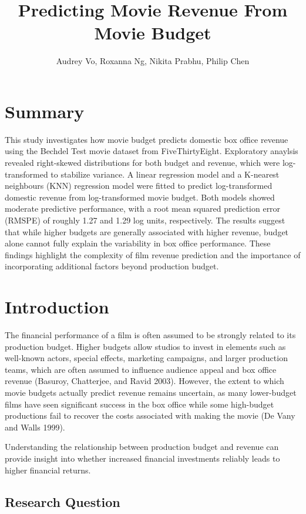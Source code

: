 \documentclass[
  letterpaper,
  DIV=11,
  numbers=noendperiod]{scrartcl}
\title{Predicting Movie Revenue From Movie Budget}
\author{Audrey Vo, Roxanna Ng, Nikita Prabhu, Philip Chen}
\date{}
\begin{document}
\maketitle


\section{Summary}\label{summary}

This study investigates how movie budget predicts domestic box office
revenue using the Bechdel Test movie dataset from FiveThirtyEight.
Exploratory anaylsis revealed right-skewed distributions for both budget
and revenue, which were log-transformed to stabilize variance. A linear
regression model and a K-nearest neighbours (KNN) regression model were
fitted to predict log-transformed domestic revenue from log-transformed
movie budget. Both models showed moderate predictive performance, with a
root mean squared prediction error (RMSPE) of roughly 1.27 and 1.29 log
units, respectively. The results suggest that while higher budgets are
generally associated with higher revenue, budget alone cannot fully
explain the variability in box office performance. These findings
highlight the complexity of film revenue prediction and the importance
of incorporating additional factors beyond production budget.

\section{Introduction}\label{introduction}

The financial performance of a film is often assumed to be strongly
related to its production budget. Higher budgets allow studios to invest
in elements such as well-known actors, special effects, marketing
campaigns, and larger production teams, which are often assumed to
influence audience appeal and box office revenue (Basuroy, Chatterjee,
and Ravid 2003). However, the extent to which movie budgets actually
predict revenue remains uncertain, as many lower-budget films have seen
significant success in the box office while some high-budget productions
fail to recover the costs associated with making the movie (De Vany and
Walls 1999).

Understanding the relationship between production budget and revenue can
provide insight into whether increased financial investments reliably
leads to higher financial returns.

\subsection{Research Question}\label{research-question}
\end{document}

